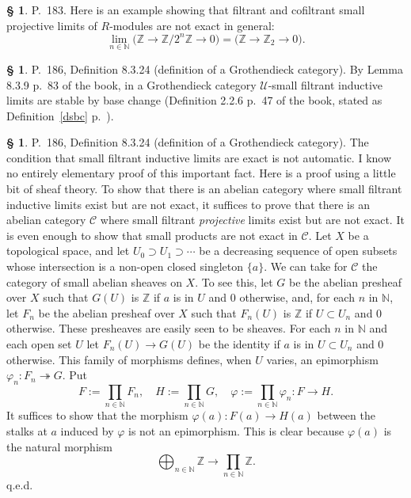 \documentclass[12pt]{article}%
\theoremstyle{remark}
\theoremstyle{definition}
\newtheorem{s}[thm]{\S}%
\newcommand{\bb}{\mathbb}
\newcommand{\C}{\mathcal C}
\newcommand{\U}{\mathcal U}
\newcommand{\pp}{\varphi}
\newcommand{\epi}{\twoheadrightarrow}
\begin{document}
%

\begin{s}%
P.~183. Here is an example showing that filtrant and cofiltrant small projective limits of $R$-modules are not exact in general: 
$$
\lim_{n\in\bb N}\big(\bb Z\to\bb Z/2^n\bb Z\to0\big)=\big(\bb Z\to\bb Z_2\to0\big).
$$
\end{s}

%

\begin{s}\label{gcsbc}
P.~186, Definition 8.3.24 (definition of a Grothendieck category). By Lemma 8.3.9 p.~83 of the book, in a Grothendieck category $\U$-small filtrant inductive limits are stable by base change (Definition 2.2.6 p.~47 of the book, stated as Definition~\ref{dsbc} p.~\pageref{dsbc}).
\end{s}

%

\begin{s} 
P.~186, Definition 8.3.24 (definition of a Grothendieck category). The condition that small filtrant inductive limits are exact is not automatic. I know no entirely elementary proof of this important fact. Here is a proof using a little bit of sheaf theory. To show that there is an abelian category where small filtrant inductive limits exist but are not exact, it suffices to prove that there is an abelian category $\C$ where small filtrant {\em projective} limits exist but are not exact. It is even enough to show that small products are not exact in $\C$. Let $X$ be a topological space, and let $U_0\supset U_1\supset\cdots$ be a decreasing sequence of open subsets whose intersection is a non-open closed singleton $\{a\}$. We can take for $\C$ the category of small abelian sheaves on $X$. To see this, let $G$ be the abelian presheaf over $X$ such that $G(U)$ is $\mathbb Z$ if $a$ is in $U$ and 0 otherwise, and, for each $n$ in $\mathbb N$, let $F_n$ be the abelian presheaf over $X$ such that $F_n(U)$ is $\mathbb Z$ if $U\subset U_n$ and 0 otherwise. These presheaves are easily seen to be sheaves. For each $n$ in $\mathbb N$ and each open set $U$ let $F_n(U)\to G(U)$ be the identity if $a$ is in $U\subset U_n$ and 0 otherwise. This family of morphisms defines, when $U$ varies, an epimorphism $\pp_n:F_n\epi G$. Put 
$$
F:=\prod_{n\in\mathbb N}F_n,\quad H:=\prod_{n\in\mathbb N}G,\quad\pp:=\prod_{n\in\mathbb N}\pp_n:F\to H.
$$ 
It suffices to show that the morphism $\pp(a):F(a)\to H(a)$ between the stalks at $a$ induced by $\pp$ is not an epimorphism. This is clear because $\pp(a)$ is the natural morphism 
$$
\bigoplus_{n\in\mathbb N}\mathbb Z\to\prod_{n\in\mathbb N}\mathbb Z.
$$
q.e.d.
\end{s}
\end{document}
